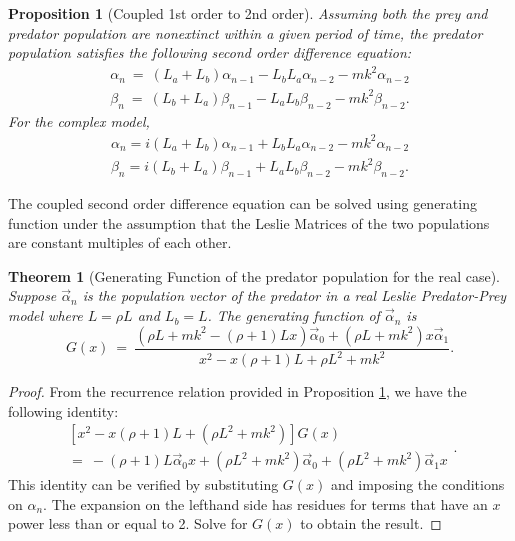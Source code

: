 \documentclass[11pt,reqno]{amsart}
\numberwithin{equation}{section}
\newtheorem{prop}[thm]{Proposition}
\theoremstyle{plain}
\newtheorem{theorem}[thm]{Theorem}
\begin{document}
\begin{prop}[Coupled 1st order to 2nd order]\label{thm:to2ndOrd}
Assuming both 
the prey and predator population are nonextinct within 
a given period of time, 
the predator population satisfies the following second order 
difference equation:
\begin{eqnarray}
\alpha_n \ =\ (L_a + L_b) \alpha_{n - 1} - L_b L_a \alpha_{n -2} - m k^2 \alpha_{n - 2} \nonumber
\\
\beta_n \ =\ (L_b + L_a) \beta_{n - 1} - L_a L_b \beta_{n -2} - m k^2 \beta_{n - 2}.
\end{eqnarray}
For the complex model, 
\begin{eqnarray}
\alpha_n = i(L_a + L_b) \alpha_{n - 1} + L_b L_a \alpha_{n -2} - m k^2 \alpha_{n - 2} \nonumber
\\
\beta_n = i(L_b + L_a) \beta_{n - 1} + L_a L_b \beta_{n -2} - m k^2 \beta_{n - 2}. \label{cmplx_model}
\end{eqnarray}
\end{prop}


The coupled second order difference equation can be solved using 
generating function under the assumption that the Leslie Matrices 
of the two populations are constant multiples of each other. 

\begin{theorem} [Generating Function of the predator population for the real case]
    Suppose $\vec \alpha_n$ is the population vector 
    of the predator in a real Leslie Predator-Prey model where 
    $L = \rho L$ and $L_b = L$. 
    The generating function of $\vec \alpha_n$ is
    \begin{equation}
        G(x) \ = \ 
\frac{ \left(\rho L + m k^2 - (\rho + 1) L x\right)\vec \alpha_0 + (\rho L + m k^2) x \vec  \alpha_1}{x^2 - x(\rho + 1) L + \rho L^2 + m k^2}.
    \end{equation}
\end{theorem}

\begin{proof}
    From the recurrence relation provided in Proposition \ref{thm:to2ndOrd}, 
    we have the following identity: 
    \begin{equation}
        \begin{split}
        \left[x^2 - x (\rho + 1) L + (\rho L^2 + mk^2)\right]G(x) \\ = \  
        -(\rho + 1) L \vec \alpha_0 x 
        +(\rho L^2 + mk^2) \vec \alpha_0 
        + (\rho L^2  + m k^2) \vec \alpha_1 x
        \end{split}.
    \end{equation}
    This identity can be verified by substituting $G(x)$ and 
    imposing the conditions on $\alpha_n$. The expansion on the 
    lefthand side has residues for terms that have an $x$ power 
    less than or equal to 2. Solve for $G(x)$ to obtain the result. 
\end{proof}
\end{document}
